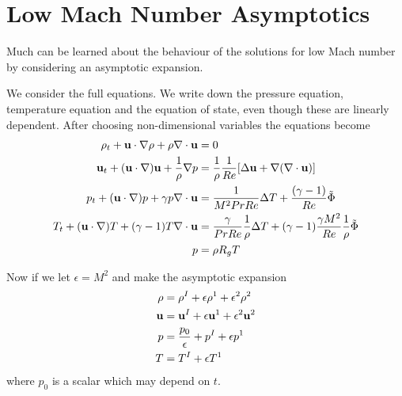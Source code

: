\documentclass[10pt]{article}
\begin{document}
\section{Low Mach Number Asymptotics}


Much can be learned about the behaviour of the solutions for low Mach number by considering 
an asymptotic expansion.

We consider the full equations. We write down the pressure equation, temperature equation
and the equation of state, even though these are linearly dependent. After choosing non-dimensional
variables the equations become
\begin{align*}
   \rho_t + {\bf u}\cdot\nabla\rho + \rho\nabla\cdot{\bf u} &= 0 \\
   {\bf u}_t + ({\bf u}\cdot\nabla){\bf u} + {1\over\rho}\nabla p &= {1\over\rho} {1\over Re} [\Delta {\bf u} + \nabla(\nabla\cdot{\bf u}) ] \\
   p_t + ({\bf u}\cdot\nabla) p + \gamma p \nabla\cdot{\bf u} &= 
           {1 \over M^2 Pr Re}  \Delta{T} +{(\gamma-1)\over Re} \tilde{\Phi}    \\
   T_t + ({\bf u}\cdot\nabla) T +(\gamma-1) T \nabla\cdot{\bf u}
       &= {\gamma \over Pr Re} { 1 \over \rho } \Delta T
       + (\gamma-1) { \gamma M^2 \over Re} {1\over \rho } \tilde{\Phi}               \\
   p &= \rho R_g T
\end{align*}


\newcommand{\eps}{\epsilon}

Now if we let $\eps = M^2$ and make the asymptotic expansion
\begin{align*}
    \rho &= \rho^I + \eps \rho^1 + \eps^2 \rho^2 \\
    \uv  &= \uv^I  + \eps \uv^1  + \eps^2 \uv^2 \\
    p   &= {p_0\over\eps} + p^I  + \eps p^1 \\
    T   &= T^I + \eps T^1 
\end{align*}
where $p_0$ is a scalar which may depend on $t$.
\end{document}
